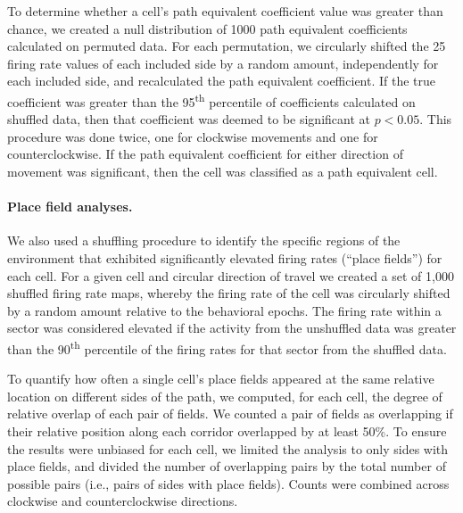 
To determine whether a cell's path equivalent coefficient value was greater than chance, we created a null distribution of 1000 path equivalent coefficients calculated on permuted data. For each permutation, we circularly shifted the 25 firing rate values of each included side by a random amount, independently for each included side, and recalculated the path equivalent coefficient. If the true coefficient was greater than the 95\textsuperscript{th} percentile of coefficients calculated on shuffled data, then that coefficient was deemed to be significant at $p<0.05$. This procedure was done twice, one for clockwise movements and one for counterclockwise. If the path equivalent coefficient for either direction of movement was significant, then the cell was classified as a path equivalent cell.


\paragraph{Place field analyses.}  We also used a shuffling procedure to identify the specific regions of the environment that exhibited significantly elevated firing rates (``place fields'') for each cell.  For a given cell and circular direction of travel we created a set of 1,000 shuffled firing rate maps, whereby the firing rate of the cell was circularly shifted by a random amount relative to the behavioral epochs. The firing rate within a sector was considered elevated if the activity from the unshuffled data was greater than the 90\textsuperscript{th} percentile of the firing rates for that sector from the shuffled data.

To quantify how often a single cell's place fields appeared at the same relative location on different sides of the path, we computed, for each cell, the degree of relative overlap of each pair of fields. We counted a pair of fields as overlapping if their relative position along each corridor overlapped by at least 50\%.  To ensure the results were unbiased for each cell, we limited the analysis to only sides with place fields, and divided the number of overlapping pairs by the total number of possible pairs (i.e., pairs of sides with place fields). Counts were combined across clockwise and counterclockwise directions. 

